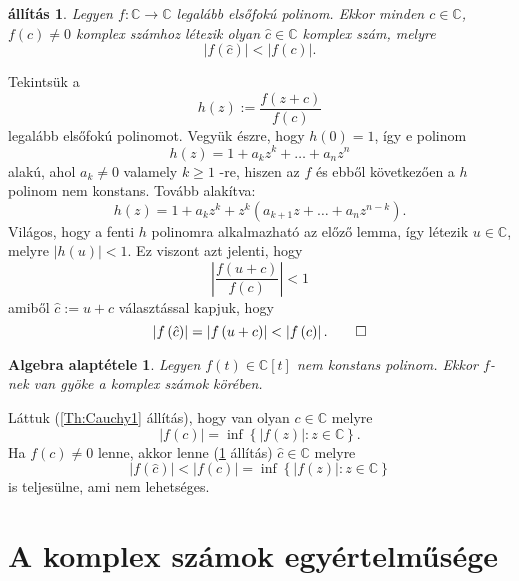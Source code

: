 \documentclass[9pt, showtrims]{memoir}
\makeatletter
\renewenvironment{proof}[1][\proofname]
    {\par\pushQED{\qed}%
    \normalfont \topsep6\p@\@plus6\p@\relax
    \trivlist
    \item[\hskip\labelsep
        \itshape
    #1\@addpunct{:}]\ignorespaces}
    {\popQED\endtrivlist\@endpefalse}
\theoremstyle{plain}
\newtheorem{proposition}{állítás}[section]
\newtheorem*{FA}{Algebra alaptétele}
\theoremstyle{remark}
\theoremstyle{definition}
\makeatother
\begin{document}
\begin{proposition}
\label{Th:Cauchy2}Legyen $f:\mathbb{C}\rightarrow \mathbb{C}$ legalább elsőfokú polinom.
Ekkor minden $c\in \mathbb{C}$, $f\left( c\right) \neq 0$
komplex számhoz létezik olyan $\hat{c}\in \mathbb{C}$ komplex szám,
melyre 
\[
\left| f\left( \hat{c}\right) \right| <\left| f\left( c\right) \right| .
\]
\end{proposition}

\begin{proof}
Tekintsük a 
\[
h\left( z\right) :=\frac{f\left( z+c\right) }{f\left( c\right) }
\]
legalább elsőfokú polinomot.
Vegyük észre, hogy $h\left(
0\right) =1$, így e polinom 
\[
h\left( z\right) =1+a_{k}z^{k}+\ldots +a_{n}z^{n}
\]
alakú, ahol $a_{k}\neq 0$ valamely $k\geq 1$ -re, hiszen az $f$ és
ebből következően a $h$ polinom nem konstans.
Tovább alakítva: 
\[
h\left( z\right) =1+a_{k}z^{k}+z^{k}\left( a_{k+1}z+\ldots
+a_{n}z^{n-k}\right) .
\]
Világos, hogy a fenti $h$ polinomra alkalmazható az előző
lemma, így létezik $u\in \mathbb{C}$, melyre $\left| h\left( u\right)
\right| <1.$ Ez viszont azt jelenti, hogy 
\[
\left| \frac{f\left( u+c\right) }{f\left( c\right) }\right| <1
\]
amiből $\hat{c}:=u+c$ választással kapjuk, hogy 
\[
\left| f\left( \hat{c}\right) \right| =\left| f\left( u+c\right) \right|
<\left| f\left( c\right) \right| .\qedhere
\]
\end{proof}

\begin{FA}\label{Th:FundOfAlg}
    Legyen $f\left( t \right)\in\mathbb{C}[t]$ nem konstans polinom.
    Ekkor $f$-nek van gyöke a komplex számok körében.
\end{FA}

\begin{proof}
Láttuk (\ref{Th:Cauchy1} állítás), hogy van olyan $c\in \mathbb{C}$ melyre 
\[
\left| f\left( c\right) \right| =\inf \left\{ \left| f\left( z\right)
\right| :z\in \mathbb{C}\right\} \text{.}
\]
Ha $f(c)\neq 0$ lenne, akkor lenne (\ref{Th:Cauchy2} állítás) $\hat{c}\in \mathbb{C}$ melyre 
\[
\left| f\left( \hat{c}\right) \right| <\left| f\left( c\right) \right| =\inf
\left\{ \left| f\left( z\right) \right| :z\in \mathbb{C}\right\} 
\]
is teljesülne, ami nem lehetséges.
\end{proof}

\section{A komplex számok egyértelműsége}
\end{document}
